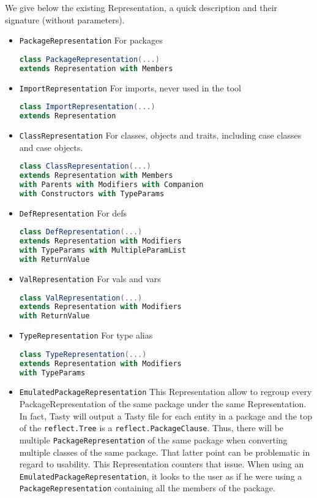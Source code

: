 \documentclass{report}
\begin{document}
We give below the existing Representation, a quick description and their signature (without parameters).
\begin{itemize}
    \item \texttt{PackageRepresentation} For packages
\begin{lstlisting}[language=scala]
class PackageRepresentation(...)
extends Representation with Members
\end{lstlisting}
    \item \texttt{ImportRepresentation} For imports, never used in the tool
\begin{lstlisting}[language=scala]
class ImportRepresentation(...)
extends Representation
\end{lstlisting}
    \item \texttt{ClassRepresentation} For classes, objects and traits, including case classes and case objects.
\begin{lstlisting}[language=scala]
class ClassRepresentation(...)
extends Representation with Members
with Parents with Modifiers with Companion
with Constructors with TypeParams
\end{lstlisting}
    \item \texttt{DefRepresentation} For defs
\begin{lstlisting}[language=scala]
class DefRepresentation(...)
extends Representation with Modifiers
with TypeParams with MultipleParamList
with ReturnValue
\end{lstlisting}
    \item \texttt{ValRepresentation} For vals and vars
\begin{lstlisting}[language=scala]
class ValRepresentation(...)
extends Representation with Modifiers
with ReturnValue
\end{lstlisting}
    \item \texttt{TypeRepresentation} For type alias
\begin{lstlisting}[language=scala]
class TypeRepresentation(...)
extends Representation with Modifiers
with TypeParams 
\end{lstlisting}
    \item \texttt{EmulatedPackageRepresentation} This Representation allow to regroup every PackageRepresentation of the same package under the same Representation. In fact, Tasty will output a Tasty file for each entity in a package and the top of the \texttt{reflect.Tree} is a \texttt{reflect.PackageClause}. Thus, there will be multiple \texttt{PackageRepresentation} of the same package when converting multiple classes of the same package. That latter point can be problematic in regard to usability. This Representation counters that issue. When using an \texttt{EmulatedPackageRepresentation}, it looks to the user as if he were using a \texttt{PackageRepresentation} containing all the members of the package.
\end{itemize}
\end{document}
